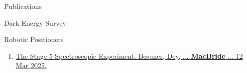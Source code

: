 \documentclass{resume} %
\begin{document}
\begin{rSection}{Publications}
\begin{rSubsection}{Dark Energy Survey}{}{}{}
\begin{enumerate}
        \end{enumerate}
            
    \end{rSubsection}    
    
%            
%            
%
%            
%            
%
%            
%            
%    
    \begin{rSubsection}{Robotic Positioners}{}{}{} %
        \begin{enumerate}
            \item \href{https://arxiv.org/abs/2503.07923}{The Stage-5 Spectroscopic Experiment. Besuner, Dey, ... \textbf{MacBride} ... 12 Mar 2025.}
            
        \end{enumerate}
            
    \end{rSubsection}        


    
\end{rSection}
\end{document}
